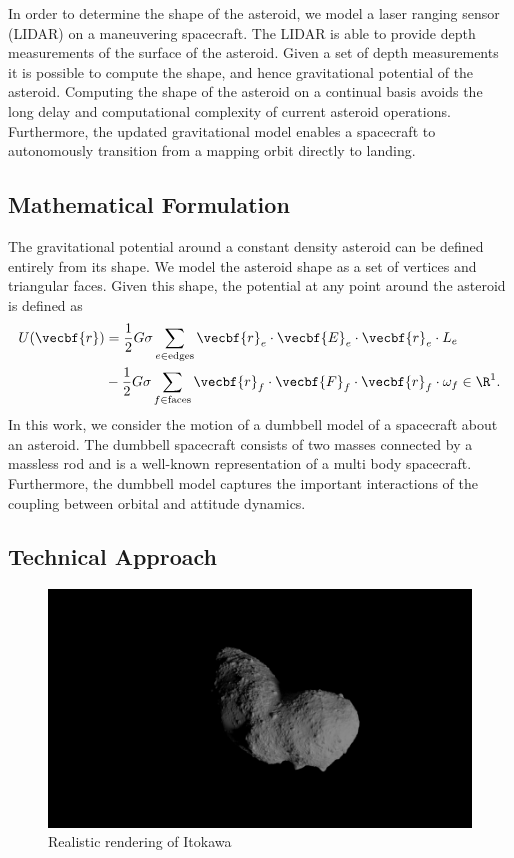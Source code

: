 \documentclass[11pt,reqno,twocolumn]{article} %
\begin{document}
In order to determine the shape of the asteroid, we model a laser ranging sensor (LIDAR) on a maneuvering spacecraft.
The LIDAR is able to provide depth measurements of the surface of the asteroid.
Given a set of depth measurements it is possible to compute the shape, and hence gravitational potential of the asteroid.
Computing the shape of the asteroid on a continual basis avoids the long delay and computational complexity of current asteroid operations.
Furthermore, the updated gravitational model enables a spacecraft to autonomously transition from a mapping orbit directly to landing.

\subsection*{Mathematical Formulation}\label{se:mathematical_problem}
The gravitational potential around a constant density asteroid can be defined entirely from its shape.
We model the asteroid shape as a set of vertices and triangular faces.
Given this shape, the potential at any point around the asteroid is defined as
\begin{align}\label{eq:potential}
    U(\vecbf{r}) &= \frac{1}{2} G \sigma \sum_{e \in \text{edges}} \vecbf{r}_e \cdot \vecbf{E}_e \cdot \vecbf{r}_e \cdot L_e \nonumber\\
                 &- \frac{1}{2}G \sigma \sum_{f \in \text{faces}} \vecbf{r}_f \cdot \vecbf{F}_f \cdot \vecbf{r}_f \cdot \omega_f \in \R^1.
\end{align}
In this work, we consider the motion of a dumbbell model of a spacecraft about an asteroid.
The dumbbell spacecraft consists of two masses connected by a massless rod and is a well-known representation of a multi body spacecraft.
Furthermore, the dumbbell model captures the important interactions of the coupling between orbital and attitude dynamics. 

\subsection*{Technical Approach}

\begin{figure}
    \centering
    \includegraphics[width=\columnwidth,trim={50mm 30mm 50mm 30mm},clip]{figures/itokawa_blender.png}
    \caption{Realistic rendering of Itokawa}
\end{figure}
\end{document}
